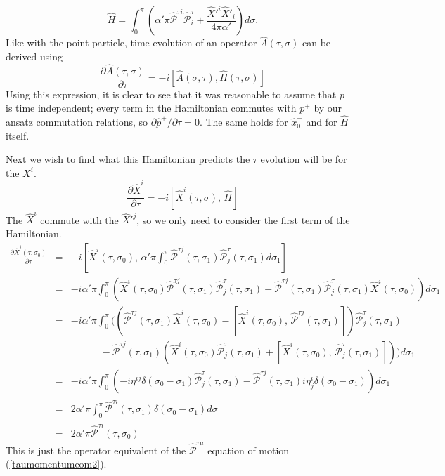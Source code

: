 \documentclass[a4paper,12pt]{article}
\numberwithin{equation}{section}
\begin{document}
\begin{equation}\label{stringhamiltonian}
\hat{H} = \int_0^\pi\left(\alpha'\pi\hat{\mathcal{P}}^{\tau i}\hat{\mathcal{P}}^\tau_i + \frac{\hat{X}'^i\hat{X}'_i}{4\pi\alpha'}\right)d\sigma.
\end{equation}
Like with the point particle, time evolution of an operator $\hat{A}(\tau,\sigma)$ can be derived using
\begin{equation}
\frac{\partial\hat{A}(\tau,\sigma)}{\partial \tau} = -i[\hat{A}(\sigma,\tau),\hat{H}(\tau,\sigma)]
\end{equation}
Using this expression, it is clear to see that it was reasonable to assume that $p^+$ is time independent; every term in the Hamiltonian commutes with $p^+$ by our ansatz commutation relations, so $\partial \hat{p}^+ / \partial \tau = 0$. The same holds for $\hat{x}_0^-$ and for $\hat{H}$ itself. 

Next we wish to find what this Hamiltonian predicts the $\tau$ evolution will be for the $X^i$.
\begin{equation}
\frac{\partial \hat{X}^i}{\partial \tau} = - i\left[\hat{X}^i(\tau,\sigma),\,\hat{H}\right]
\end{equation}
The $\hat{X}^i$ commute with the $\hat{X}'^j$, so we only need to consider the first term of the Hamiltonian.
\begin{eqnarray}
\frac{\partial \hat{X}^i(\tau,\sigma_0)}{\partial \tau} &=& - i\left[\hat{X}^i(\tau,\sigma_0),\,\alpha'\pi\int_0^\pi\hat{\mathcal{P}}^{\tau j}(\tau,\sigma_1)\hat{\mathcal{P}}^\tau_j(\tau,\sigma_1)d\sigma_1\right]\nonumber\\
&=&-i\alpha'\pi\int_0^\pi\left(\hat{X}^i(\tau,\sigma_0)\hat{\mathcal{P}}^{\tau j}(\tau,\sigma_1)\hat{\mathcal{P}}^\tau_j(\tau,\sigma_1)-\hat{\mathcal{P}}^{\tau j}(\tau,\sigma_1)\hat{\mathcal{P}}^\tau_j(\tau,\sigma_1)\hat{X}^i(\tau,\sigma_0)\right)d\sigma_1\nonumber\\
&=&-i\alpha'\pi\int_0^\pi\bigg(\left(\hat{\mathcal{P}}^{\tau j}(\tau,\sigma_1)\hat{X}^i(\tau,\sigma_0)-\left[\hat{X}^i(\tau,\sigma_0),\,\hat{\mathcal{P}}^{\tau j}(\tau,\sigma_1)\right]\right)\hat{\mathcal{P}}^\tau_j(\tau,\sigma_1)\nonumber\\
&&\quad\quad\quad-\hat{\mathcal{P}}^{\tau j}(\tau,\sigma_1)\left(\hat{X}^i(\tau,\sigma_0)\hat{\mathcal{P}}^\tau_j(\tau, \sigma_1) + \left[\hat{X}^i(\tau,\sigma_0),\,\hat{\mathcal{P}}^\tau_j(\tau,\sigma_1)\right]\right)\bigg) d\sigma_1\nonumber\\
&=& -i\alpha'\pi\int_0^\pi\left(-i\eta^{i j}\delta(\sigma_0-\sigma_1)\hat{\mathcal{P}}^\tau_j(\tau,\sigma_1)-\hat{\mathcal{P}}^{\tau j}(\tau,\sigma_1)i\eta^i_j\delta(\sigma_0-\sigma_1)\right)d\sigma_1\nonumber\\
&=& 2\alpha'\pi\int_0^\pi\hat{\mathcal{P}}^{\tau i}(\tau,\sigma_1)\delta(\sigma_0-\sigma_1)d\sigma\nonumber\\
&=&2\alpha'\pi\hat{\mathcal{P}}^{\tau i}(\tau, \sigma_0)\label{foo8}
\end{eqnarray}
This is just the operator equivalent of the $\hat{\mathcal{P}}^{\tau \mu}$ equation of motion (\ref{taumomentumeom2}).
\end{document}

